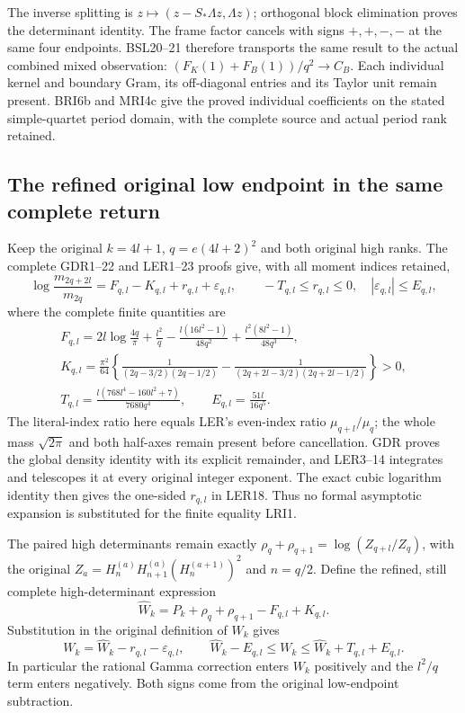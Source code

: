 \documentclass[11pt,a4paper]{article}
\begin{document}
The inverse splitting is $z\mapsto(z-S_*\Lambda z,\Lambda z)$;
orthogonal block elimination proves the determinant identity.
The frame factor cancels with signs $+,+,-,-$ at the same four
endpoints. BSL20--21 therefore transports the same result to the
actual combined mixed observation:
$(F_K(1)+F_B(1))/q^2\to C_B$. Each individual kernel and
boundary Gram, its off-diagonal entries and its Taylor unit
remain present. BRI6b and MRI4c give the proved individual
coefficients on the stated simple-quartet period domain, with the
complete source and actual period rank retained.


\subsection{The refined original low endpoint in the same complete return}

Keep the original $k=4l+1$, $q=e(4l+2)^2$ and both original
high ranks. The complete GDR1--22 and LER1--23 proofs give,
with all moment indices retained,
\[
 \log\frac{m_{2q+2l}}{m_{2q}}
 =F_{q,l}-K_{q,l}+r_{q,l}+\varepsilon_{q,l},\qquad
 -T_{q,l}\leq r_{q,l}\leq0,\quad
 |\varepsilon_{q,l}|\leq E_{q,l},
 \tag{LRI1}
\]
where the complete finite quantities are
\[
\begin{gathered}
 F_{q,l}=2l\log\frac{4q}{\pi}+\frac{l^2}{q}
 -\frac{l(16l^2-1)}{48q^2}
 +\frac{l^2(8l^2-1)}{48q^3},\\
 K_{q,l}=\frac{\pi^2}{64}\left\{
 \frac1{(2q-3/2)(2q-1/2)}
 -\frac1{(2q+2l-3/2)(2q+2l-1/2)}\right\}>0,\\
 T_{q,l}=\frac{l(768l^4-160l^2+7)}{7680q^4},\qquad
 E_{q,l}=\frac{51l}{16q^5}.
\end{gathered}\tag{LRI2}
\]
The literal-index ratio here equals LER's even-index ratio
$\mu_{q+l}/\mu_q$; the whole mass $\sqrt{2\pi}$ and both
half-axes remain present before cancellation. GDR proves the
global density identity with its explicit remainder, and LER3--14
integrates and telescopes it at every original integer exponent.
The exact cubic logarithm identity then gives the one-sided
$r_{q,l}$ in LER18. Thus no formal asymptotic expansion is
substituted for the finite equality LRI1.

The paired high determinants remain exactly
$\rho_q+\rho_{q+1}=\log(Z_{q+l}/Z_q)$, with the original
$Z_a=H_n^{(a)}H_{n+1}^{(a)}(H_n^{(a+1)})^2$ and $n=q/2$.
Define the refined, still complete high-determinant expression
\[
 \widehat W_k=P_k+\rho_q+\rho_{q+1}-F_{q,l}+K_{q,l}.
\]
Substitution in the original definition of $W_k$ gives
\[
 W_k=\widehat W_k-r_{q,l}-\varepsilon_{q,l},\qquad
 \widehat W_k-E_{q,l}\leq W_k
                  \leq\widehat W_k+T_{q,l}+E_{q,l}.
 \tag{LRI3}
\]
In particular the rational Gamma correction enters $W_k$
positively and the $l^2/q$ term enters negatively. Both signs
come from the original low-endpoint subtraction.
\end{document}
